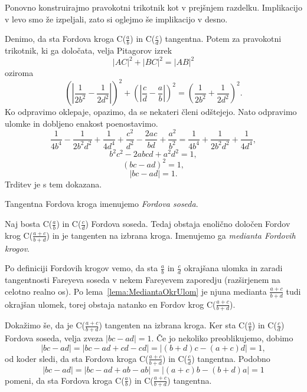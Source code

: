 \documentclass[mat1]{fmfdelo}
\begin{document}
\begin{dokaz}
%
Ponovno konstruirajmo pravokotni trikotnik kot v prejšnjem razdelku. Implikacijo v levo smo že izpeljali, zato si oglejmo še implikacijo v desno.

Denimo, da sta Fordova kroga C($\frac{a}{b}$) in C($\frac{c}{d}$) tangentna. Potem za pravokotni trikotnik, ki ga določata, velja Pitagorov izrek 
\[ |AC|^2 + |BC|^2 = |AB|^2 \] oziroma
\[ \left ( \left | \frac{1}{2b^2} - \frac{1}{2d^2} \right | \right )^2 + \left ( \left| \frac{c}{d} - \frac{a}{b} \right| \right )^2 = \left (\frac{1}{2b^2} + \frac{1}{2d^2} \right )^2. \]
Ko odpravimo oklepaje, opazimo, da se nekateri členi odštejejo. Nato odpravimo ulomke in dobljeno enakost poenostavimo.
\[ \frac{1}{4b^4} - \frac{1}{2b^{2}d^{2}} + \frac{1}{4d^4} + \frac{c^2}{d^2} - \frac{2ac}{bd} + \frac{a^2}{b^2} = \frac{1}{4b^4} + \frac{1}{2b^{2}d^{2}} + \frac{1}{4d^4}, \]
\[ b^{2}c^{2} - 2abcd + a^{2}d^{2} = 1, \]
\[  (bc-ad)^2 = 1, \]
\[ |bc-ad|=1. \]
Trditev je s tem dokazana.
\end{dokaz}

\begin{definicija}
Tangentna Fordova kroga imenujemo \emph{Fordova soseda}.
\end{definicija}

\begin{trditev}
Naj bosta C($\frac{a}{b}$) in C($\frac{c}{d}$) Fordova soseda. Tedaj obstaja enolično določen Fordov krog C($\frac{a+c}{b+d}$) in je tangenten na izbrana kroga. Imenujemo ga \emph{medianta Fordovih krogov}.
\end{trditev}

\begin{dokaz}
Po definiciji Fordovih krogov vemo, da sta $\frac{a}{b}$ in $\frac{c}{d}$ okrajšana ulomka in zaradi tangentnosti Fareyeva soseda v nekem Fareyevem zaporedju (razširjenem na celotno realno os). Po lema~\ref{lema:MediantaOkrUlom} je njuna medianta $\frac{a+c}{b+d}$ tudi okrajšan ulomek, torej obstaja natanko en Fordov krog C($\frac{a+c}{b+d}$). 

Dokažimo še, da je C($\frac{a+c}{b+d}$) tangenten na izbrana kroga. Ker sta C($\frac{a}{b}$) in C($\frac{c}{d}$) Fordova soseda, velja zveza 
\( |bc-ad|=1. \)
Če jo nekoliko preoblikujemo, dobimo
\[ |bc-ad|=|bc-ad+cd-cd|=|(b+d)c-(a+c)d|=1, \]
od koder sledi, da sta Fordova kroga C($\frac{a+c}{b+d}$) in C($\frac{c}{d}$) tangentna.
Podobno
\[ |bc-ad|=|bc-ad+ab-ab|=|(a+c)b-(b+d)a|=1 \]
pomeni, da sta Fordova kroga C($\frac{a}{b}$) in C($\frac{a+c}{b+d}$) tangentna.
\end{dokaz}
\end{document}
